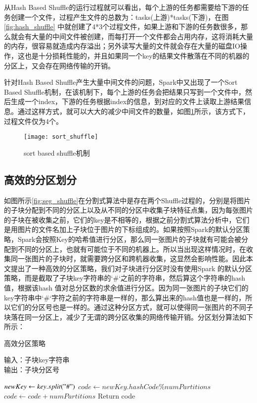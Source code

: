 从Hash Based Shuffle的运行过程就可以看出，每个上游的任务都需要给下游的任务创建一个文件，过程产生文件的总数为：tasks(上游)*tasks(下游)，在图\ref{fig:hash_shuffle} 中就创建了4*3个过程文件，如果上游和下游的任务数很多，那么就会有大量的中间文件被创建，而每打开一个文件都会占用内存，这将消耗大量的内存，很容易就造成内存溢出；另外读写大量的文件就会存在大量的磁盘IO操作，这也是十分损耗性能的，并且如果同一个key的结果文件散落在不同的机器的分区上，又会存在网络传输的开销。

针对Hash Based Shuffle产生大量中间文件的问题，Spark中又出现了一个Sort Based Shuffle机制，在该机制下，每个上游的任务会把结果只写到一个文件中，然后生成一个index，下游的任务根据index的信息，到对应的文件上读取上游结果信息。通过这样方式，就可以大大的减少中间文件的数量，如图\ref{fig:sort_shuffle}所示，该方式下，过程文件仅为4个。
\begin{figure}[htp]
\centering
\texttt{[image: sort\_shuffle]}
\caption{sort based shuffle机制}
\label{fig:sort_shuffle}
\end{figure}

\subsection{高效的分区划分}
如图所示\ref{fig:seg_shuffle}在分割式算法中是存在两个Shuffle过程的，分别是将图片的子块分配到不同的分区上以及从不同的分区中收集子块特征点集，因为每张图片的子块在被收集之前，它们的key是不相等的，根据之前分割式算法分析中，它们是用图片的文件名加上子块位于图片的下标组成的。如果按照Spark的默认分区策略，Spark会按照Key的哈希值进行分区，那么同一张图片的子块就有可能会被分配到不同的分区上，也就有可能位于不同的机器上。所以当出现这样情况时，在收集同一张图片的子块时，就需要跨分区和跨机器收集，这显然会影响性能。因此本文提出了一种高效的分区策略，我们对子块进行分区时没有使用Spark 的默认分区策略，而是截取了子块key字符串的`\#`之前的字符串，然后算这个字符串的hash值，根据该hash 值对总分区数的求余值进行分区。因为同一张图片的子块它们的key字符串中`\#`字符之前的字符串是一样的，那么算出来的hash值也是一样的，所以它们的分区号也是一样的。通过这种分区方式，就可以使得同一张图片的不同子块落在同一分区上，减少了无谓的跨分区收集的网络传输开销。分区划分算法如下所示：
\begin{algorithm}[htbp]
  \caption{高效分区策略}
  \label{algDiveModel}
  输入：子块key字符串\\
  输出：子块分区号
  \begin{algorithmic}[1]
    \STATE $newKey\leftarrow key.split("\#")$
    \STATE $code\leftarrow newKey.hashCode\%numPartitions$
        \STATE $code\leftarrow code + numPartitions$
    \ENDIF
    \STATE Return code
  \end{algorithmic}
\end{algorithm}


